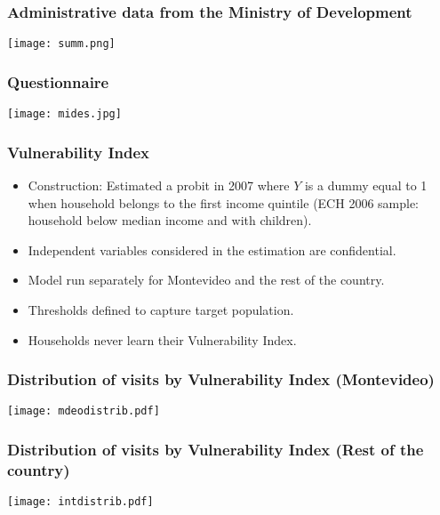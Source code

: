 \documentclass{beamer}
\begin{document}
\begin{frame}
\frametitle{Administrative data from the Ministry of Development}
\begin{center}
	\texttt{[image: summ.png]}
	\label{summ}
\end{center}
\end{frame}

\begin{frame}
\frametitle{Questionnaire}
\begin{center}
\texttt{[image: mides.jpg]}
\label{mides}
\end{center}
\end{frame}

\begin{frame}
\frametitle{Vulnerability Index}
\begin{itemize}
\item Construction: Estimated a probit in 2007 where $Y$ is a dummy equal to 1 when household belongs to the first income quintile (ECH 2006 sample: household below median income and with children).
\item Independent variables considered in the estimation are confidential.
\item Model run separately for Montevideo and the rest of the country.
\item Thresholds defined to capture target population.
\item Households never learn their Vulnerability Index.	
\end{itemize}
\end{frame}

\begin{frame}
\frametitle{Distribution of visits by Vulnerability Index (Montevideo)}
\begin{center}
	\texttt{[image: mdeodistrib.pdf]}
	\label{mdeodistrib}
\end{center}
\end{frame}

\begin{frame}
\frametitle{Distribution of visits by Vulnerability Index (Rest of the country)}
\begin{center}
	\texttt{[image: intdistrib.pdf]}
	\label{intdistrib}
\end{center}
\end{frame}
\end{document}
